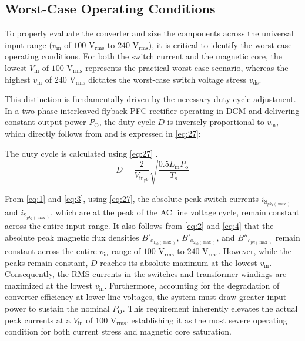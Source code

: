 \documentclass[lettersize,journal]{IEEEtran}
\begin{document}
\subsection{Worst-Case Operating Conditions}
To properly evaluate the converter and size the components across the universal input range ($v_{\text{in}}$ of $100\text{ V}_{\text{rms}}$ to $240\text{ V}_{\text{rms}}$), it is critical to identify the worst-case operating conditions. For both the switch current and the magnetic core, the lowest $V_{\text{in}}$ of $100\text{ V}_{\text{rms}}$ represents the practical worst-case scenario, whereas the highest $v_{\text{in}}$ of $240\text{ V}_{\text{rms}}$ dictates the worst-case switch voltage stress $v_{\text{ds}}$.

This distinction is fundamentally driven by the necessary duty-cycle adjustment. In a two-phase interleaved flyback PFC rectifier operating in DCM and delivering constant output power $P_{\text{O}}$, the duty cycle $D$ is inversely proportional to $v_{\text{in}}$, which directly follows from \cite{ref8} and is expressed in \eqref{eq:27}:

The duty cycle is calculated using \eqref{eq:27} \cite{ref8}.
\begin{equation}
\label{eq:27}
D = \frac{2}{V_{\mathrm{in}_{\mathrm{pk}}}} \sqrt{\frac{0.5 L_{\mathrm{m}} P_{\mathrm{o}}}{T_{\mathrm{s}}}}
\end{equation}

From \eqref{eq:1} and \eqref{eq:3}, using \eqref{eq:27}, the absolute peak switch currents $i_{\mathrm{S}_{pk_1(\max)}}$ and $i_{\mathrm{S}_{pk_2(\max)}}$, which are at the peak of the AC line voltage cycle, remain constant across the entire input range. It also follows from \eqref{eq:2} and \eqref{eq:4} that the absolute peak magnetic flux densities $B'_{\mathrm{o}_{1_{pk}(\max)}}$, $B'_{\mathrm{o}_{2_{pk}(\max)}}$, and $B''_{\mathrm{c}_{pk(\max)}}$ remain constant across the entire $v_{\text{in}}$ range of $100\text{ V}_{\text{rms}}$ to $240\text{ V}_{\text{rms}}$. However, while the peaks remain constant, $D$ reaches its absolute maximum at the lowest $v_{\text{in}}$. Consequently, the RMS currents in the switches and transformer windings are maximized at the lowest $v_{\text{in}}$. Furthermore, accounting for the degradation of converter efficiency at lower line voltages, the system must draw greater input power to sustain the nominal $P_{\text{O}}$. This requirement inherently elevates the actual peak currents at a $V_{\text{in}}$ of $100\text{ V}_{\text{rms}}$, establishing it as the most severe operating condition for both current stress and magnetic core saturation.
\end{document}
